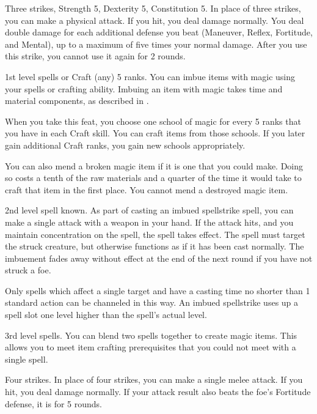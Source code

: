 \featpre Three strikes, Strength 5, Dexterity 5, Constitution 5.
\featben In place of three strikes, you can make a physical attack.
If you hit, you deal damage normally.
You deal double damage for each additional defense you beat (Maneuver, Reflex, Fortitude, and Mental), up to a maximum of five times your normal damage.
After you use this strike, you cannot use it again for 2 rounds.

\featpre 1st level spells or Craft (any) 5 ranks.
\featben You can imbue items with magic using your spells or crafting ability.
Imbuing an item with magic takes time and material components, as described in .

When you take this feat, you choose one school of magic for every 5 ranks that you have in each Craft skill.
You can craft items from those schools.
If you later gain additional Craft ranks, you gain new schools appropriately.

You can also mend a broken magic item if it is one that you could make.
Doing so costs a tenth of the raw materials and a quarter of the time it would take to craft that item in the first place.
You cannot mend a destroyed magic item.

\featpre 2nd level spell known.
\featben As part of casting an imbued spellstrike spell, you can make a single attack with a weapon in your hand.
If the attack hits, and you maintain concentration on the spell, the spell takes effect.
The spell must target the struck creature, but otherwise functions as if it has been cast normally.
The imbuement fades away without effect at the end of the next round if you have not struck a foe.

Only spells which affect a single target and have a casting time no shorter than 1 standard action can be channeled in this way.
An imbued spellstrike uses up a spell slot one level higher than the spell's actual level.

\featpre 3rd level spells.
\featben You can blend two spells together to create magic items.
This allows you to meet item crafting prerequisites that you could not meet with a single spell.

\featpre Four strikes.
\featben In place of four strikes, you can make a single melee attack.
If you hit, you deal damage normally.
If your attack result also beats the foe's Fortitude defense, it is \immobilized for 5 rounds.

